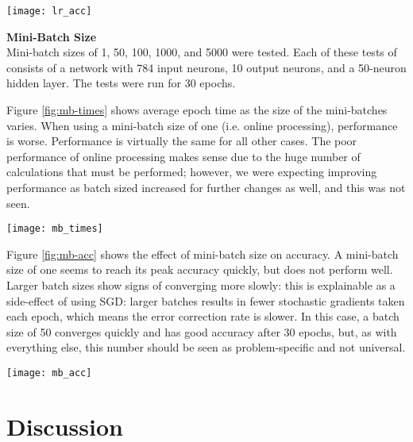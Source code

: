 \documentclass[letter,11pt,titlepage]{article}
\begin{document}
\begin{center}
    \centering
    \texttt{[image: lr\_acc]}
    \label{fig:lr-acc}
\end{center}

\textbf{\large{Mini-Batch Size}} \\
Mini-batch sizes of 1, 50, 100, 1000, and 5000 were tested. Each of these tests of consists of a network with 784 input neurons, 10 output neurons, and a 50-neuron hidden layer. The tests were run for 30 epochs.

Figure \ref{fig:mb-times} shows average epoch time as the size of the mini-batches varies. When using a mini-batch size of one (i.e. online processing), performance is worse. Performance is virtually the same for all other cases. The poor performance of online processing makes sense due to the huge number of calculations that must be performed; however, we were expecting improving performance as batch sized increased for further changes as well, and this was not seen.

\begin{center}
    \centering
    \texttt{[image: mb\_times]}
    \label{fig:mb-times}
\end{center}

Figure \ref{fig:mb-acc} shows the effect of mini-batch size on accuracy. A mini-batch size of one seems to reach its peak accuracy quickly, but does not perform well. Larger batch sizes show signs of converging more slowly: this is explainable as a side-effect of using SGD: larger batches results in fewer stochastic gradients taken each epoch, which means the error correction rate is slower. In this case, a batch size of 50 converges quickly and has good accuracy after 30 epochs, but, as with everything else, this number should be seen as problem-specific and not universal. 

\begin{center}
    \centering
    \texttt{[image: mb\_acc]}
    \label{fig:mb-acc}
\end{center}

\section{Discussion}
\end{document}

